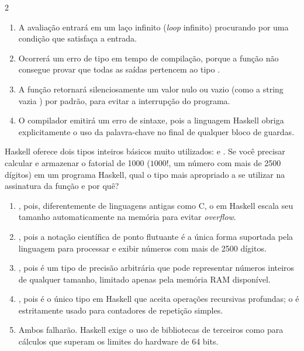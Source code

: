 \documentclass[a4paper,10pt,brazil]{article}
\begin{document}
\begin{multicols}{2}
\begin{enumerate}
  \item A avaliação entrará em um laço infinito (\emph{loop} infinito) procurando por uma condição que satisfaça a entrada.

  \item Ocorrerá um erro de tipo em tempo de compilação, porque a função não consegue provar que todas as saídas pertencem ao tipo .

  \item A função retornará silenciosamente um valor nulo ou vazio (como a string vazia ) por padrão, para evitar a interrupção do programa.

  \item O compilador emitirá um erro de sintaxe, pois a linguagem Haskell obriga explicitamente o uso da palavra-chave  no final de qualquer bloco de guardas.


\end{enumerate}

Haskell oferece dois tipos inteiros básicos muito utilizados:  e . Se você precisar calcular e armazenar o fatorial de 1000 ($1000!$, um número com mais de 2500 dígitos) em um programa Haskell, qual o tipo mais apropriado a se utilizar na assinatura da função e por quê?

\begin{enumerate}
  \item {}, pois, diferentemente de linguagens antigas como C, o  em Haskell escala seu tamanho automaticamente na memória para evitar \emph{overflow}.

  \item {}, pois a notação científica de ponto flutuante é a única forma suportada pela linguagem para processar e exibir números com mais de 2500 dígitos.

  \item {}, pois é um tipo de precisão arbitrária que pode representar números inteiros de qualquer tamanho, limitado apenas pela memória RAM disponível.

  \item {}, pois é o único tipo em Haskell que aceita operações recursivas profundas; o  é estritamente usado para contadores de repetição simples.

  \item Ambos falharão. Haskell exige o uso de bibliotecas de terceiros como  para cálculos que superam os limites do hardware de 64 bits.



\end{enumerate}
\end{multicols}
\end{document}
